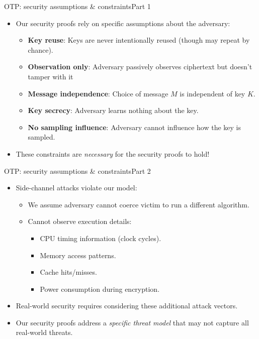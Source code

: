 \documentclass[aspectratio=169, lualatex, handout]{beamer}
\begin{document}
\begin{frame}{OTP: security assumptions \& constraints}{Part 1}
	\begin{itemize}[<+->]
		\item Our security proofs rely on specific assumptions about the adversary:
		      \begin{itemize}[<+->]
			      \item \textbf{Key reuse}: Keys are never intentionally reused (though may repeat by chance).
			      \item \textbf{Observation only}: Adversary passively observes ciphertext but doesn't tamper with it
			      \item \textbf{Message independence}: Choice of message $M$ is independent of key $K$.
			      \item \textbf{Key secrecy}: Adversary learns nothing about the key.
			      \item \textbf{No sampling influence}: Adversary cannot influence how the key is sampled.
		      \end{itemize}
		\item These constraints are \textit{necessary} for the security proofs to hold!
	\end{itemize}
\end{frame}

\begin{frame}{OTP: security assumptions \& constraints}{Part 2}
	\begin{itemize}[<+->]
		\item Side-channel attacks violate our model:
		      \begin{itemize}[<+->]
			      \item We assume adversary cannot coerce victim to run a different algorithm.
			      \item Cannot observe execution details:
			            \begin{itemize}[<+->]
				            \item CPU timing information (clock cycles).
				            \item Memory access patterns.
				            \item Cache hits/misses.
				            \item Power consumption during encryption.
			            \end{itemize}
		      \end{itemize}
		\item Real-world security requires considering these additional attack vectors.
		\item Our security proofs address a \textit{specific threat model} that may not capture all real-world threats.
	\end{itemize}
\end{frame}
\end{document}
